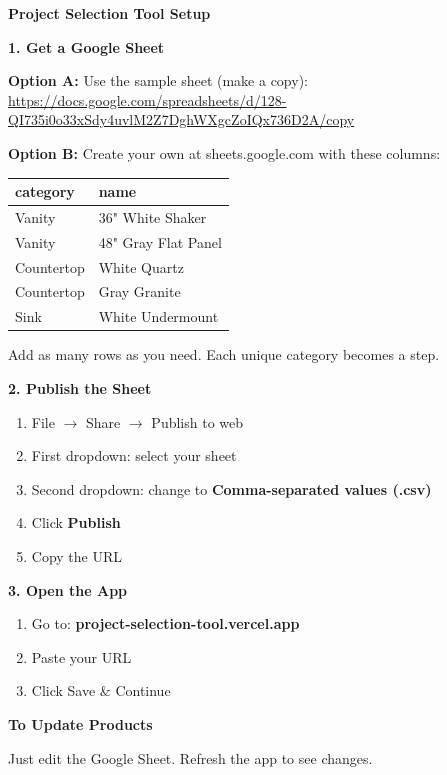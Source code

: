 \documentclass[11pt,letterpaper]{article}
\begin{document}
\begin{center}
\textbf{\Large Project Selection Tool Setup}
\end{center}

\vspace{0.5em}

\textbf{1. Get a Google Sheet}

\textbf{Option A:} Use the sample sheet (make a copy):\\
\url{https://docs.google.com/spreadsheets/d/128-QI735i0o33xSdy4uvlM2Z7DghWXgcZoIQx736D2A/copy}

\textbf{Option B:} Create your own at sheets.google.com with these columns:

\begin{center}
\begin{tabular}{ll}
\toprule
category & name \\
\midrule
Vanity & 36" White Shaker \\
Vanity & 48" Gray Flat Panel \\
Countertop & White Quartz \\
Countertop & Gray Granite \\
Sink & White Undermount \\
\bottomrule
\end{tabular}
\end{center}

Add as many rows as you need. Each unique category becomes a step.

\vspace{1em}

\textbf{2. Publish the Sheet}

\begin{enumerate}[leftmargin=2em]
\item File $\rightarrow$ Share $\rightarrow$ Publish to web
\item First dropdown: select your sheet
\item Second dropdown: change to \textbf{Comma-separated values (.csv)}
\item Click \textbf{Publish}
\item Copy the URL
\end{enumerate}

\vspace{1em}

\textbf{3. Open the App}

\begin{enumerate}[leftmargin=2em]
\item Go to: \textbf{project-selection-tool.vercel.app}
\item Paste your URL
\item Click Save \& Continue
\end{enumerate}

\vspace{1em}

\textbf{To Update Products}

Just edit the Google Sheet. Refresh the app to see changes.
\end{document}
